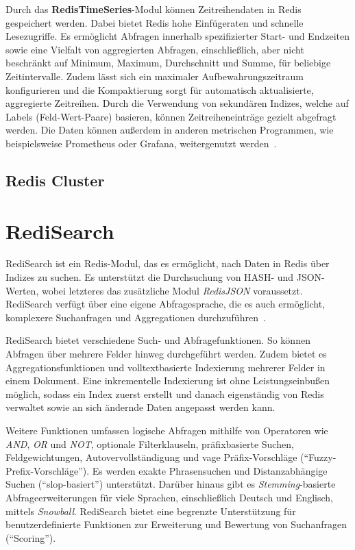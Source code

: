 Durch das \textbf{RedisTimeSeries}-Modul können Zeitreihendaten in Redis gespeichert werden.
Dabei bietet Redis hohe Einfügeraten und schnelle Lesezugriffe.
Es ermöglicht Abfragen innerhalb spezifizierter Start- und Endzeiten sowie eine Vielfalt von aggregierten Abfragen, einschließlich, aber nicht beschränkt auf Minimum, Maximum, Durchschnitt und Summe, für beliebige Zeitintervalle.
Zudem lässt sich ein maximaler Aufbewahrungszeitraum konfigurieren und die Kompaktierung sorgt für automatisch aktualisierte, aggregierte Zeitreihen.
Durch die Verwendung von sekundären Indizes, welche auf Labels (Feld-Wert-Paare) basieren, können Zeitreiheneinträge gezielt abgefragt werden.
Die Daten können außerdem in anderen metrischen Programmen, wie beispielsweise Prometheus oder Grafana, weitergenutzt werden~\cite{redis_ltd_time_nodate}.



\subsection{Redis Cluster}

\section{RediSearch}

RediSearch ist ein Redis-Modul, das es ermöglicht, nach Daten in Redis über Indizes zu suchen.
Es unterstützt die Durchsuchung von HASH- und JSON-Werten, wobei letzteres das zusätzliche Modul \emph{RedisJSON} voraussetzt.
RediSearch verfügt über eine eigene Abfragesprache, die es auch ermöglicht, komplexere Suchanfragen und Aggregationen durchzuführen~\cite{redis_ltd_search_nodate}. %

RediSearch bietet verschiedene Such- und Abfragefunktionen.
So können Abfragen über mehrere Felder hinweg durchgeführt werden.
Zudem bietet es Aggregationsfunktionen und volltextbasierte Indexierung mehrerer Felder in einem Dokument.
Eine inkrementelle Indexierung ist ohne Leistungseinbußen möglich, sodass ein Index zuerst erstellt und danach eigenständig von Redis verwaltet sowie an sich ändernde Daten angepasst werden kann.

Weitere Funktionen umfassen logische Abfragen mithilfe von Operatoren wie \emph{AND}, \emph{OR} und \emph{NOT}, optionale Filterklauseln, präfixbasierte Suchen, Feldgewichtungen, Autovervollständigung und vage Präfix-Vorschläge (\enquote{Fuzzy-Prefix-Vorschläge}).
Es werden exakte Phrasensuchen und Distanzabhängige Suchen (\enquote{slop-basiert}) unterstützt. Darüber hinaus gibt es \emph{Stemming}-basierte Abfrageerweiterungen für viele Sprachen, einschließlich Deutsch und Englisch, mittels \emph{Snowball}.
RediSearch bietet eine begrenzte Unterstützung für benutzerdefinierte Funktionen zur Erweiterung und Bewertung von Suchanfragen (\enquote{Scoring}).

